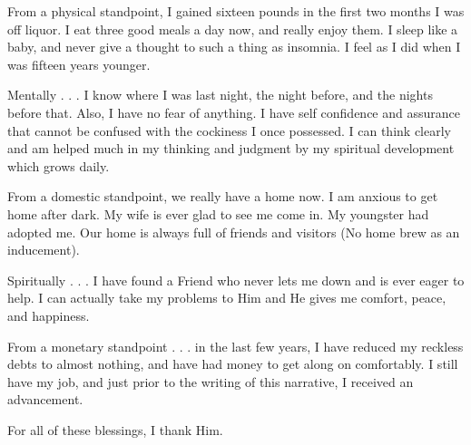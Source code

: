 \begin{biblechapter}
      From a physical standpoint, I gained sixteen pounds in the first two months I was off liquor. I eat three good meals a day now, and really enjoy them. I sleep like a baby, and never give a thought to such a thing as insomnia. I feel as I did when I was fifteen years younger.

Mentally . . . I know where I was last night, the night before, and the nights before that. Also, I have no fear of anything. I have self confidence and assurance that cannot be confused with the cockiness I once possessed. I can think clearly and am helped much in my thinking and judgment by my spiritual development which grows daily.

From a domestic standpoint, we really have a home now. I am anxious to get home after dark. My wife is ever glad to see me come in. My youngster had adopted me. Our home is always full of friends and visitors (No home brew as an inducement).

Spiritually . . . I have found a Friend who never lets me down and is ever eager to help. I can actually take my problems to Him and He gives me comfort, peace, and happiness.

From a monetary standpoint . . . in the last few years, I have reduced my reckless debts to almost nothing, and have had money to get along on comfortably. I still have my job, and just prior to the writing of this narrative, I received an advancement.

For all of these blessings, I thank Him.
\end{biblechapter}
